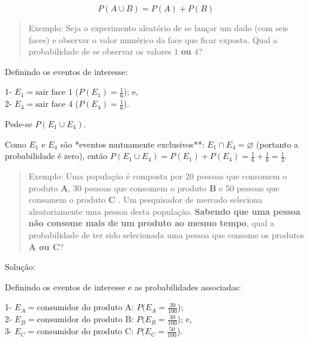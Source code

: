 \documentclass[
]{book}
\begin{document}
\hfill\break

\[
P(A \cup B) = P(A) + P(B)
\]

\hfill\break

\begin{quote}
Exemplo: Seja o experimento aleatório de se lançar um dado (com seis faces) e observar o valor numérico da face que ficar exposta. Qual a probabilidade de se observar os valores \(1\) \textbf{ou} \(4\)?
\end{quote}

\hfill\break

Definindo os eventos de interesse:

\hfill\break

1- \(E_{1}=\text{sair face 1}\) (\(P(E_{1})=\frac{1}{6}\)); e,\\
2- \(E_{4}=\text{sair face 4}\) (\(P(E_{4})=\frac{1}{6}\)).

\hfill\break

Pede-se \(P(E_{1} \cup E_{4})\).

\hfill\break

Como \(E_{1}\) e \(E_{4}\) são *eventos mutuamente exclusivos**: \(E_{1} \cap E_{4}=\varnothing\) (portanto a probabilidade é zero), então \(P(E_{1} \cup E_{4}) = P(E_{1}) + P(E_{4}) = \frac{1}{6} + \frac{1}{6}= \frac{1}{3}\).

\hfill\break

\begin{quote}
Exemplo: Uma população é composta por 20 pessoas que consomem o produto \textbf{A}, 30 pessoas que consomem o produto \textbf{B} e 50 pessoas que consomem o produto \textbf{C} . Um pesquisador de mercado seleciona aleatoriamente uma pessoa desta população. \textbf{Sabendo que uma pessoa não consome mais de um produto ao mesmo tempo}, qual a probabilidade de ter sido selecionada uma pessoa que consome os produtos \textbf{A ou C}?
\end{quote}

\hfill\break

Solução:

\hfill\break

Definindo os eventos de interesse e as probabilidades associadas:

\hfill\break

1- \(E_{A}=\text{consumidor do produto A}\): \(P(E_{A}=\frac{20}{100}\));\\
2- \(E_{B}=\text{consumidor do produto B}\): \(P(E_{B}=\frac{30}{100}\)); e,\\
3- \(E_{C}=\text{consumidor do produto C}\): \(P(E_{C}=\frac{50}{100}\)).
\end{document}
